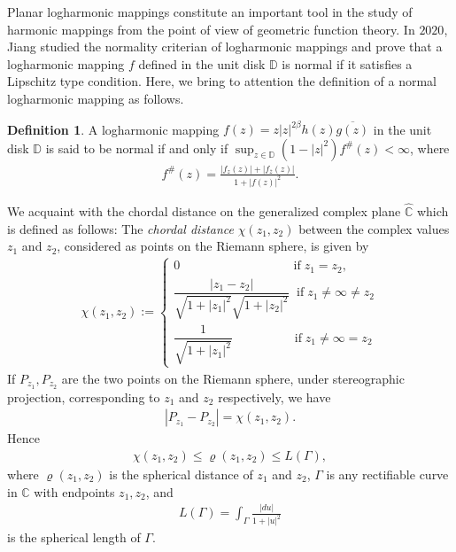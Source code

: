 \documentclass[a4paper,12pt]{amsart}
\theoremstyle{plain}
\theoremstyle{definition}
\newtheorem{defn}{Definition}[section]
\begin{document}
Planar logharmonic mappings constitute an important tool in the study of harmonic mappings from the point of view of geometric function theory. In $2020$, Jiang \cite{Jiang-HJM-2020} studied the normality criterian of logharmonic mappings and prove that a logharmonic mapping $f$ defined in the unit disk $\mathbb{D}$ is normal if it satisfies a Lipschitz type condition. Here, we bring to attention the definition of a normal logharmonic mapping as follows.
\begin{defn}\cite{Jiang-HJM-2020}
A logharmonic mapping $f(z)=z|z|^{2\beta}h(z)\overline{g(z)}$ in the unit disk $\mathbb{D}$ is said to be normal if and only if $\sup_{z\in\mathbb{D}}(1-|z|^2) f^{\#}(z)<\infty$, where
\begin{align*}
	f^{\#}(z)=\frac{|f_z(z)|+|f_{\overline{z}}(z)|}{1+|f(z)|^2}.
\end{align*}
\end{defn}
We acquaint with the chordal distance on the generalized complex plane $\hat{\mathbb{C}}$ which is defined as follows: The \textit{chordal distance} $\chi(z_1, z_2)$ between the complex values $z_1$ and $z_2$, considered
as points on the Riemann sphere, is given by
\begin{align}\label{eq-1.5}
	\chi(z_1, z_2):=
	\begin{cases}
		0\;\;\;\;\;\;\;\;\;\;\;\;\;\;\;\;\;\;\;\;\;\;\;\;\;\;\;\;\;\;\;\;\; \mbox{if}\; z_1=z_2,\\
		\dfrac{|z_1-z_2|}{\sqrt{1+|z_1|^2}\sqrt{1+|z_2|^2}} \;\;\mbox{if}\; z_1\neq \infty\neq z_2\\
		\dfrac{1}{\sqrt{1+|z_1|^2}} \;\;\;\;\;\;\;\;\;\;\;\; \;\;\;\;\;\; \mbox{if}\; z_1\neq \infty =z_2
	\end{cases}
\end{align}
If $P_{z_1}, P_{z_2}$ are the two points on the Riemann sphere, under stereographic projection, corresponding to $z_1$ and $z_2$ respectively, we have
\begin{align*}
	|P_{z_1} -P_{z_2}|=\chi(z_1, z_2).
\end{align*}
Hence
\begin{align*}
	\chi(z_1, z_2)\leq \varrho(z_1,z_2)\leq L(\Gamma),
\end{align*}
where $\varrho(z_1,z_2)$ is the spherical distance of $z_1$ and $z_2$, $\Gamma$ is any rectifiable curve in $\mathbb{C}$ with endpoints $z_1,z_2$, and
\begin{align*}
	L(\Gamma)=\int_{\Gamma} \frac{|du|}{1+|u|^2}
\end{align*}
is the spherical length of $\Gamma$. \vspace{1.5mm}
\end{document}

